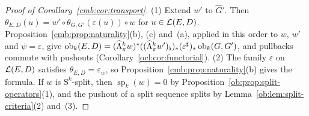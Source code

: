 \begin{proof}[Proof of Corollary~\ref{cmb:cor:transport}]
(1) Extend $w'$ to $\widehat G'$. Then $\theta_{E,D}(u)=w'\circ\theta_{G,G'}(\varepsilon(u))\circ w$ for $u\in\mathcal L(E,D)$.
Proposition~\ref{cmb:prop:naturality}(b), (c) and~(a), applied in this order to $w$, $w'$ and $\psi=\varepsilon$, give
$\operatorname{ob}_k(E,D)=(\widehat\Lambda^k_\pi w)^*((\widehat\Lambda^k_\pi w')_\flat)_*(\varepsilon^\sharp)_*\operatorname{ob}_k(G,G')$, and pullbacks
commute with pushouts (Corollary~\ref{ocl:cor:functorial}). (2) The family $\varepsilon$ on $\mathcal L(E,D)$ satisfies
$\theta_{E,D}=\varepsilon_w$, so Proposition~\ref{cmb:prop:naturality}(b) gives the formula. If $w$ is $\mathrm S^k$-split,
then $\operatorname{sp}_k(w)=0$ by Proposition~\ref{ob:prop:split-operators}(1), and the pushout of a split sequence splits by
Lemma~\ref{ob:lem:split-criteria}(2) and~(3).
\end{proof}

